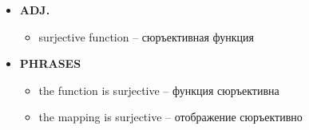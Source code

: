 \documentclass[a4paper, 10pt]{article}
\theoremstyle{definition}
\theoremstyle{plain}
\theoremstyle{remark}
\begin{document}
\begin{itemize}
    \item \textbf{ADJ.}
    \begin{itemize}
        \item surjective function – сюръективная функция
    \end{itemize}
    
    \item \textbf{PHRASES}
    \begin{itemize}
        \item the function is surjective – функция сюръективна
        \item the mapping is surjective – отображение сюръективно
    \end{itemize}
\end{itemize}
\end{document}
